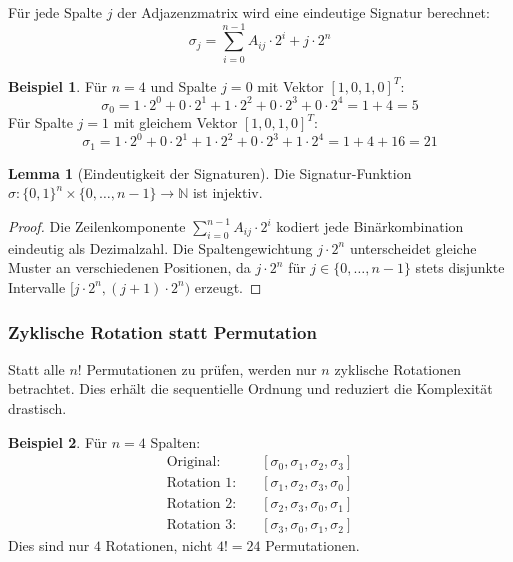 ﻿\documentclass[a4paper,12pt]{article}
\theoremstyle{definition}
\newtheorem{beispiel}{Beispiel}[section]
\newtheorem{lemma}{Lemma}[section]
\begin{document}
F\"ur jede Spalte $j$ der Adjazenzmatrix wird eine eindeutige Signatur berechnet:
\[
\sigma_j = \sum_{i=0}^{n-1} A_{ij} \cdot 2^i + j \cdot 2^n
\]

\begin{beispiel}
	F\"ur $n=4$ und Spalte $j=0$ mit Vektor $[1, 0, 1, 0]^T$:
	\[
	\sigma_0 = 1 \cdot 2^0 + 0 \cdot 2^1 + 1 \cdot 2^2 + 0 \cdot 2^3 + 0 \cdot 2^4 = 1 + 4 = 5
	\]
	F\"ur Spalte $j=1$ mit gleichem Vektor $[1, 0, 1, 0]^T$:
	\[
	\sigma_1 = 1 \cdot 2^0 + 0 \cdot 2^1 + 1 \cdot 2^2 + 0 \cdot 2^3 + 1 \cdot 2^4 = 1 + 4 + 16 = 21
	\]
\end{beispiel}

\begin{lemma}[Eindeutigkeit der Signaturen]
	Die Signatur-Funktion $\sigma: \{0,1\}^n \times \{0,\ldots,n-1\} \to \mathbb{N}$
	ist injektiv.
\end{lemma}

\begin{proof}
	Die Zeilenkomponente $\sum_{i=0}^{n-1} A_{ij} \cdot 2^i$ kodiert jede
	Bin\"arkombination eindeutig als Dezimalzahl. Die Spaltengewichtung $j \cdot 2^n$
	unterscheidet gleiche Muster an verschiedenen Positionen, da $j \cdot 2^n$ f\"ur
	$j \in \{0,\ldots,n-1\}$ stets disjunkte Intervalle $[j \cdot 2^n, (j+1) \cdot 2^n)$
	erzeugt.
\end{proof}

\subsubsection{Zyklische Rotation statt Permutation}

Statt alle $n!$ Permutationen zu pr\"ufen, werden nur $n$ zyklische Rotationen
betrachtet. Dies erh\"alt die sequentielle Ordnung und reduziert die Komplexit\"at
drastisch.

\begin{beispiel}
	F\"ur $n=4$ Spalten:
	\begin{align*}
		\text{Original:} & \quad [\sigma_0, \sigma_1, \sigma_2, \sigma_3] \\
		\text{Rotation 1:} & \quad [\sigma_1, \sigma_2, \sigma_3, \sigma_0] \\
		\text{Rotation 2:} & \quad [\sigma_2, \sigma_3, \sigma_0, \sigma_1] \\
		\text{Rotation 3:} & \quad [\sigma_3, \sigma_0, \sigma_1, \sigma_2]
	\end{align*}
	Dies sind nur $4$ Rotationen, nicht $4! = 24$ Permutationen.
\end{beispiel}
\end{document}
